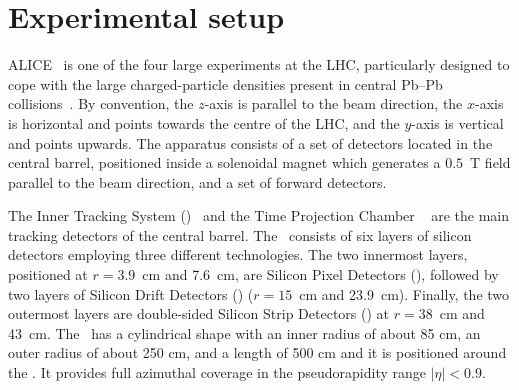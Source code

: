 \section{Experimental setup}
\label{Sec:ExpSetup}
ALICE~\cite{Aamodt:2008zz,Abelev:2014ffa} is one of the four large experiments at the LHC, particularly designed to cope with the large charged-particle densities present in central Pb--Pb collisions~\cite{Aamodt:2010pb}. By convention, the $z$-axis is parallel to the beam direction, the $x$-axis is horizontal and points towards the centre of the LHC, and the $y$-axis is vertical and points upwards. The apparatus consists of a set of detectors located in the central barrel, positioned inside a solenoidal magnet which generates a $0.5$~T field parallel to the beam direction, and a set of forward detectors. 

The Inner Tracking System (\ITS)~\cite{Aamodt:2008zz} and the Time Projection Chamber \TPC~\cite{Alme:2010ke} are the main tracking detectors of the central barrel. The \ITS~consists of six layers of silicon detectors employing three different technologies. The two innermost layers, positioned at $r = 3.9$~cm and 7.6~cm,  are Silicon Pixel Detectors (\SPD), followed by two layers of Silicon Drift Detectors (\SDD) ($r = 15$~cm and 23.9~cm). Finally, the two outermost layers are double-sided Silicon Strip Detectors (\SSD) at $r = 38$~cm and 43~cm. The \TPC~has a cylindrical shape with an inner radius of about 85 cm, an outer radius of about 250 cm, and a length of 500 cm and it is positioned around the \ITS. It provides full azimuthal coverage in the pseudorapidity range $|\eta| < 0.9$. 

